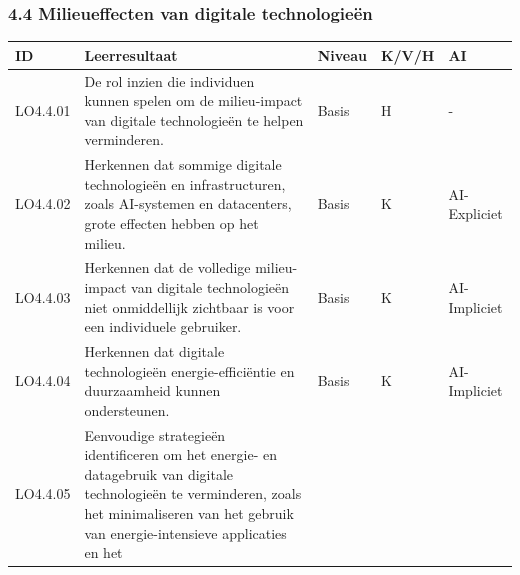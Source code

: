 \documentclass[
  dutch,
  letterpaper,
  DIV=11,
  numbers=noendperiod]{scrartcl}
\begin{document}
\subsubsection{4.4 Milieueffecten van digitale
technologieën}\label{milieueffecten-van-digitale-technologieuxebn}

\begin{longtable}[]{@{}
  >{\centering\arraybackslash}p{}
  >{\centering\arraybackslash}p{}
  >{\centering\arraybackslash}p{}
  >{\centering\arraybackslash}p{}
  >{\centering\arraybackslash}p{}@{}}
\toprule\noalign{}
\begin{minipage}[b]{\linewidth}\centering
ID
\end{minipage} & \begin{minipage}[b]{\linewidth}\centering
Leerresultaat
\end{minipage} & \begin{minipage}[b]{\linewidth}\centering
Niveau
\end{minipage} & \begin{minipage}[b]{\linewidth}\centering
K/V/H
\end{minipage} & \begin{minipage}[b]{\linewidth}\centering
AI
\end{minipage} \\
\midrule\noalign{}
\endhead
\bottomrule\noalign{}
\endlastfoot
LO4.4.01 & De rol inzien die individuen kunnen spelen om de
milieu-impact van digitale technologieën te helpen verminderen. & Basis
& H & - \\
LO4.4.02 & Herkennen dat sommige digitale technologieën en
infrastructuren, zoals AI-systemen en datacenters, grote effecten hebben
op het milieu. & Basis & K & AI-Expliciet \\
LO4.4.03 & Herkennen dat de volledige milieu-impact van digitale
technologieën niet onmiddellijk zichtbaar is voor een individuele
gebruiker. & Basis & K & AI-Impliciet \\
LO4.4.04 & Herkennen dat digitale technologieën energie-efficiëntie en
duurzaamheid kunnen ondersteunen. & Basis & K & AI-Impliciet \\
LO4.4.05 & Eenvoudige strategieën identificeren om het energie- en
datagebruik van digitale technologieën te verminderen, zoals het
minimaliseren van het gebruik van energie-intensieve applicaties en het

\end{longtable}
\end{document}
